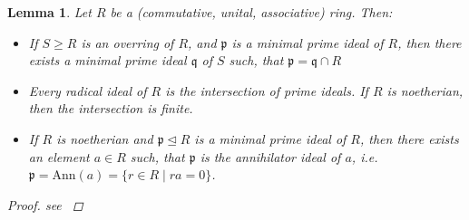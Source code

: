 \documentclass{article}
\def\p{\mathfrak{p}}
\def\q{\mathfrak{q}}
\newenvironment{bew}{\begin{proof}[Proof]}{\end{proof}}
\theoremstyle{plain}
\newtheorem{lem}[Satz]{Lemma}
\theoremstyle{definition}
\begin{document}
\begin{lem}\label{commalg}
Let $R$ be a (commutative, unital, associative) ring. Then:
\begin{itemize}
\item If $S \geq R$ is an overring of $R$, and $\p$ is a minimal prime ideal of $R$, then there exists a minimal prime ideal $\q$ of $S$ such, that $\p = \q \cap R$
\item Every radical ideal of $R$ is the intersection of prime ideals. If $R$ is noetherian, then the intersection is finite.
\item If $R$ is noetherian and $\p \unlhd R$ is a minimal prime ideal of $R$, then there exists an element $a \in R$ such, that $\p$ is the annihilator ideal of $a$, i.e. $\p = \text{Ann}(a) = \{ r \in R \mid ra = 0 \}$.
\end{itemize}
\begin{bew}
see \cite{wibmer} %
\end{bew}
\end{lem}
\end{document}
